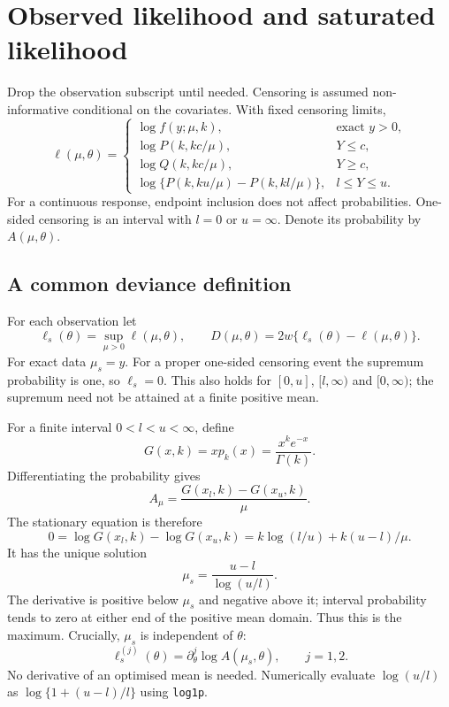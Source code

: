 \documentclass[11pt,a4paper]{article}
\newcommand{\code}[1]{\texttt{#1}}
\begin{document}
\newpage
\section{Observed likelihood and saturated likelihood}
Drop the observation subscript until needed. Censoring is assumed
non-informative conditional on the covariates. With fixed censoring limits,
\begin{equation}
 \ell(\mu,\theta)=
 \begin{cases}
 \log f(y;\mu,k), & \text{exact }y>0,\\
 \log P(k,kc/\mu), & Y\leq c,\\
 \log Q(k,kc/\mu), & Y\geq c,\\
 \log\{P(k,ku/\mu)-P(k,kl/\mu)\}, & l\leq Y\leq u.
 \end{cases}
 \label{eq:lik}
\end{equation}
For a continuous response, endpoint inclusion does not affect probabilities.
One-sided censoring is an interval with $l=0$ or $u=\infty$.
Denote its probability by $A(\mu,\theta)$.

\subsection{A common deviance definition}
For each observation let
\[
 \ell_s(\theta)=\sup_{\mu>0}\ell(\mu,\theta),\qquad
 D(\mu,\theta)=2w\{\ell_s(\theta)-\ell(\mu,\theta)\}.
\]
For exact data $\mu_s=y$. For a proper one-sided censoring event the
supremum probability is one, so $\ell_s=0$. This also holds for
$[0,u]$, $[l,\infty)$ and $[0,\infty)$; the supremum need not be attained at
a finite positive mean.

For a finite interval $0<l<u<\infty$, define
\begin{equation}
 G(x,k)=xp_k(x)=\frac{x^ke^{-x}}{\Gamma(k)}.
 \label{eq:G}
\end{equation}
Differentiating the probability gives
\begin{equation}
 A_\mu=\frac{G(x_l,k)-G(x_u,k)}{\mu}.
 \label{eq:Amu}
\end{equation}
The stationary equation is therefore
\[
 0=\log G(x_l,k)-\log G(x_u,k)
   =k\log(l/u)+k(u-l)/\mu.
\]
It has the unique solution
\begin{equation}
 \boxed{\mu_s=\frac{u-l}{\log(u/l)}}.
 \label{eq:musat}
\end{equation}
The derivative is positive below $\mu_s$ and negative above it; interval
probability tends to zero at either end of the positive mean domain.
Thus this is the maximum. Crucially, $\mu_s$ is independent of $\theta$:
\[
 \ell_s^{(j)}(\theta)=\partial_\theta^j\log A(\mu_s,\theta),\qquad j=1,2.
\]
No derivative of an optimised mean is needed. Numerically evaluate
$\log(u/l)$ as $\log\{1+(u-l)/l\}$ using \code{log1p}.
\end{document}
